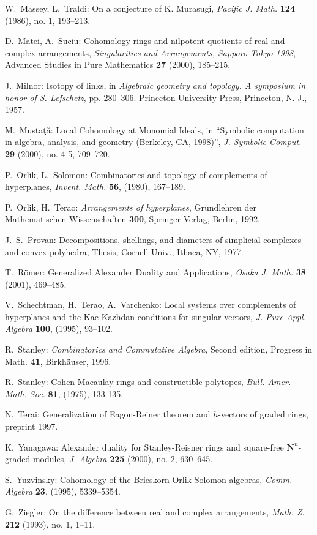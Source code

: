 \documentclass{tran-l}
\theoremstyle{definition}
\theoremstyle{remark}
\begin{document}
\begin{thebibliography}{Bjo2}
 W.~Massey, L.~Traldi:
On a conjecture of K. Murasugi,
{\sl Pacific J. Math.} \textbf{124} (1986),
no. 1, 193--213.

 D.~Matei, A.~Suciu: Cohomology rings and nilpotent 
quotients of real and complex arrangements, 
{\it Singularities and Arrangements, Sapporo-Tokyo 1998}, 
Advanced Studies in Pure Mathematics \textbf{27} (2000), 185--215.


 J.~Milnor:
Isotopy of links, in  {\it Algebraic geometry and topology.
A symposium in honor of S. Lefschetz}, pp. 280--306.
Princeton University Press, Princeton, N. J., 1957.

 M.~Musta\c t\v a: Local Cohomology at Monomial Ideals, 
in ``Symbolic computation in algebra, analysis, and geometry 
(Berkeley, CA, 1998)'', 
{\sl J. Symbolic Comput.} \textbf{29} (2000), no. 4-5, 709--720.

 P.~Orlik, L.~Solomon: Combinatorics and topology of
complements of hyperplanes, {\sl Invent. Math.} \textbf{56}, (1980), 167--189.

 P.~Orlik, H.~Terao: {\it Arrangements of hyperplanes}, 
Grundlehren der Mathematischen Wissenschaften \textbf{300}, 
Springer-Verlag, Berlin, 1992.  

 J.~S.~Provan: Decompositions, shellings, and diameters of 
simplicial complexes and convex polyhedra, Thesis, Cornell Univ., Ithaca, NY,
1977.


 T.~R\"omer: Generalized Alexander Duality and Applications, 
{\sl Osaka J. Math.} \textbf{38} (2001), 469--485.

 V.~Schechtman, H.~Terao, A.~Varchenko: Local systems over
complements of hyperplanes and the Kac-Kazhdan conditions for singular
vectors,  {\sl J. Pure Appl. Algebra} \textbf{100}, (1995), 93--102.

 R.~Stanley: {\it Combinatorics and Commutative Algebra},
Second edition, Progress in Math. \textbf{41}, Birkh\"auser, 1996. 

 R.~Stanley: Cohen-Macaulay rings and constructible
polytopes, {\sl Bull. Amer. Math. Soc.} \textbf{81}, (1975), 133-135. 

 N.~Terai: Generalization of Eagon-Reiner theorem
and $h$-vectors of graded rings, preprint 1997.     

 K.~Yanagawa: Alexander duality for Stanley-Reisner rings and
square-free $\mathbf{N}^n$-graded modules, {\sl J. Algebra} 
\textbf{225} (2000), no. 2, 630--645. 

 S.~Yuzvinsky: Cohomology of the Brieskorn-Orlik-Solomon
algebras,  {\sl Comm. Algebra} \textbf{23}, (1995), 5339--5354. 

 G.~Ziegler: On the difference  between real and  complex
arrangements,  {\sl Math. Z.} \textbf{212} (1993),  no. 1,  1--11. 
 
\end{thebibliography}
 
\end{document}
